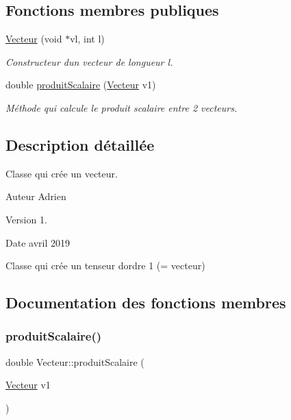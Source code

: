 \subsection*{Fonctions membres publiques}
\begin{DoxyCompactItemize}
\item 
\mbox{\label{classVecteur_a71bd85d7378f24e08e9507570d822b7e}} 
\hyperlink{classVecteur_a71bd85d7378f24e08e9507570d822b7e}{Vecteur} (void $\ast$vl, int l)
\begin{DoxyCompactList}\small\item\em Constructeur d\textquotesingle{}un vecteur de longueur l. \end{DoxyCompactList}\item 
double \hyperlink{classVecteur_a21c930ceae6b18def6b37689abceeef7}{produit\+Scalaire} (\hyperlink{classVecteur}{Vecteur} v1)
\begin{DoxyCompactList}\small\item\em Méthode qui calcule le produit scalaire entre 2 vecteurs. \end{DoxyCompactList}\end{DoxyCompactItemize}


\subsection{Description détaillée}
Classe qui crée un vecteur. 

\begin{DoxyAuthor}{Auteur}
Adrien 
\end{DoxyAuthor}
\begin{DoxyVersion}{Version}
1. 
\end{DoxyVersion}
\begin{DoxyDate}{Date}
avril 2019
\end{DoxyDate}
Classe qui crée un tenseur d\textquotesingle{}ordre 1 (= vecteur) 

\subsection{Documentation des fonctions membres}
\mbox{\label{classVecteur_a21c930ceae6b18def6b37689abceeef7}} 
\subsubsection{\texorpdfstring{produit\+Scalaire()}{produitScalaire()}}
{\footnotesize\ttfamily double Vecteur\+::produit\+Scalaire (\begin{DoxyParamCaption}\item[{\hyperlink{classVecteur}{Vecteur}}]{v1 }\end{DoxyParamCaption})}



